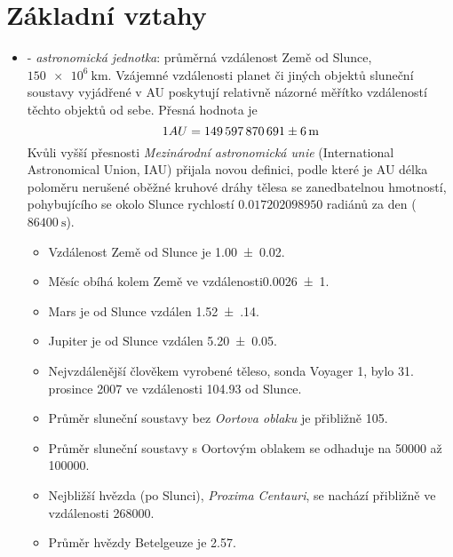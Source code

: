 {  \section{Základní vztahy}
    \begin{itemize}
      \item \wikiAU - \emph{astronomická jednotka}: průměrná vzdálenost Země od Slunce, 
      $\SI{150e6}{\km}$. Vzájemné vzdálenosti planet či jiných objektů sluneční soustavy 
      vy\-já\-dře\-né v AU poskytují relativně názorné měřítko vzdáleností těchto objektů od sebe. 
      Přesná hodnota je
      \begin{equation*}
        \sisetup{separate-uncertainty}
        1 AU = \SI[multi-part-units = single]{149597870691(6)}{\m}
      \end{equation*}
      Kvůli vyšší přesnosti \emph{Mezinárodní astronomická unie} (International Astronomical 
      Union, IAU) přijala novou de\-fi\-ni\-ci, podle které je AU délka poloměru nerušené oběžné 
      kruhové dráhy tělesa se zanedbatelnou hmotností, pohybujícího se okolo Slunce rychlostí 
      \newline \(\num{0,017202098950}\) radiánů za den (\(\SI{86400}{\second}\)). 
        \begin{itemize}
          \item Vzdálenost Země od Slunce je \SI{1.00(2)}{\AU}.
          \item Měsíc obíhá kolem Země ve vzdálenosti\newline \SI{0,0026(1)}{\AU}.
          \item Mars je od Slunce vzdálen \SI{1.52(14)}{\AU}.
          \item Jupiter je od Slunce vzdálen \SI{5.20(5)}{\AU}.
          \item Nejvzdálenější člověkem vyrobené těleso, sonda \newline Voyager 1, bylo 31.
                prosince 2007 ve vzdálenosti \SI{104.93}{\AU} od Slunce.
          \item Průměr sluneční soustavy bez \emph{Oortova oblaku} je přibližně \SI{105}{\AU}.
          \item Průměr sluneční soustavy s Oortovým oblakem se odhaduje na \SI{50000}{\AU} až    
                \SI{100000}{\AU}.
          \item Nejbližší hvězda (po Slunci), \emph{Proxima Centauri}, se nachází přibližně ve 
                vzdálenosti \SI{268000}{\AU}.
          \item Průměr hvězdy Betelgeuze je \SI{2.57}{\AU}.

\end{itemize}
\end{itemize}}
